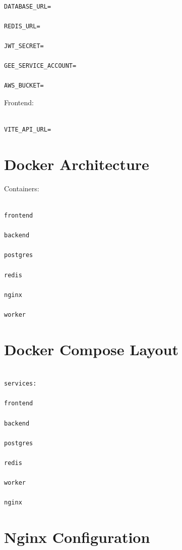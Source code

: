 \documentclass[11pt,a4paper]{article}
\begin{document}
\begin{verbatim}

DATABASE_URL=

REDIS_URL=

JWT_SECRET=

GEE_SERVICE_ACCOUNT=

AWS_BUCKET=

\end{verbatim}

Frontend:

\begin{verbatim}

VITE_API_URL=

\end{verbatim}

\section{Docker Architecture}

Containers:

\begin{verbatim}

frontend

backend

postgres

redis

nginx

worker

\end{verbatim}

\section{Docker Compose Layout}

\begin{verbatim}

services:

frontend

backend

postgres

redis

worker

nginx

\end{verbatim}

\section{Nginx Configuration}
\end{document}
